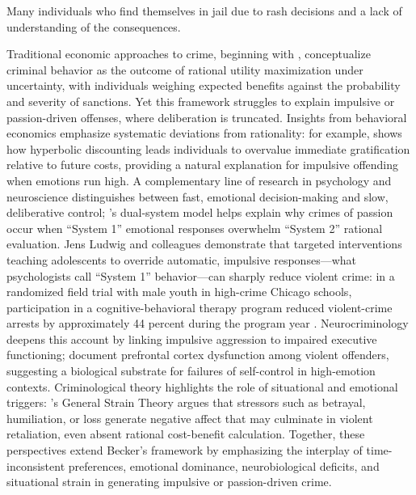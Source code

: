 \documentclass[12pt, a4paper]{article}
\begin{document}
Many individuals who find themselves in jail due to rash decisions and a lack of understanding of the consequences. 

Traditional economic approaches to crime, beginning with \citep{Becker1968}, conceptualize criminal behavior as the outcome of rational utility maximization under uncertainty, with individuals weighing expected benefits against the probability and severity of sanctions. Yet this framework struggles to explain impulsive or passion-driven offenses, where deliberation is truncated. Insights from behavioral economics emphasize systematic deviations from rationality: for example, \citep{Laibson1997} shows how hyperbolic discounting leads individuals to overvalue immediate gratification relative to future costs, providing a natural explanation for impulsive offending when emotions run high. A complementary line of research in psychology and neuroscience distinguishes between fast, emotional decision-making and slow, deliberative control; \citep{Kahneman2011}'s dual-system model helps explain why crimes of passion occur when ``System 1'' emotional responses overwhelm ``System 2'' rational evaluation. Jens Ludwig and colleagues demonstrate that targeted interventions teaching adolescents to override automatic, impulsive responses—what psychologists call “System 1” behavior—can sharply reduce violent crime: in a randomized field trial with male youth in high-crime Chicago schools, participation in a cognitive-behavioral therapy program reduced violent-crime arrests by approximately 44 percent during the program year \citep{HellerEtAl2013}. Neurocriminology deepens this account by linking impulsive aggression to impaired executive functioning; \citep{Raine1998} document prefrontal cortex dysfunction among violent offenders, suggesting a biological substrate for failures of self-control in high-emotion contexts. Criminological theory highlights the role of situational and emotional triggers: \citep{Agnew1992}'s General Strain Theory argues that stressors such as betrayal, humiliation, or loss generate negative affect that may culminate in violent retaliation, even absent rational cost-benefit calculation. Together, these perspectives extend Becker's framework by emphasizing the interplay of time-inconsistent preferences, emotional dominance, neurobiological deficits, and situational strain in generating impulsive or passion-driven crime.
\end{document}
